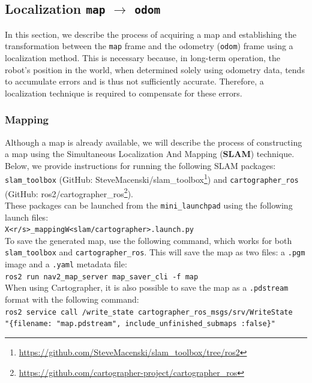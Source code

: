 \subsection{Localization \texttt{map} $\rightarrow$ \texttt{odom}}
In this section, we describe the process of acquiring a map and establishing the transformation between the \texttt{map} frame and the odometry (\texttt{odom}) frame using a localization method. This is necessary because, in long-term operation, the robot's position in the world, when determined solely using odometry data, tends to accumulate errors and is thus not sufficiently accurate. Therefore, a localization technique is required to compensate for these errors.
\subsubsection{Mapping}
Although a map is already available, we will describe the process of constructing a map using the Simultaneous Localization And Mapping (\textbf{SLAM}) technique\cite{sh-p1-prelude}. Below, we provide instructions for running the following SLAM packages: \texttt{slam\_toolbox}\cite{Macenski2021} (GitHub: SteveMacenski/slam\_toolbox\footnote{\href{https://github.com/SteveMacenski/slam_toolbox/tree/ros2}{https://github.com/SteveMacenski/slam\_toolbox/tree/ros2}}) and \texttt{cartographer\_ros}\cite{45466} \\(GitHub: ros2/cartographer\_ros\footnote{\href{https://github.com/cartographer-project/cartographer_ros}{https://github.com/cartographer-project/cartographer\_ros}}). \\These packages can be launched from the \texttt{mini\_launchpad} using the following launch files:\\
\hspace*{10mm} \texttt{X<r/s>\_mappingW<slam/cartographer>.launch.py} \\
To save the generated map, use the following command, which works for both  \texttt{slam\_toolbox} and \texttt{cartographer\_ros}. This will save the map as two files:  a \texttt{.pgm} image and a \texttt{.yaml} metadata file:\\
\hspace*{10mm} \texttt{ros2 run nav2\_map\_server map\_saver\_cli -f map}\\
When using Cartographer, it is also possible to save the map as a \texttt{.pdstream} format with the following command:\\
    \hspace*{10mm} \texttt{ros2 service call /write\_state cartographer\_ros\_msgs/srv/WriteState\\ 
    \hspace*{15mm}"\{filename: "map.pdstream", include\_unfinished\_submaps :false\}"}

